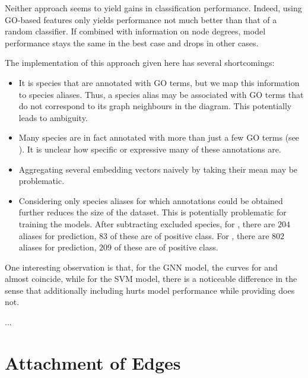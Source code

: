 \documentclass[
	fontsize=10pt, %
	twoside=false, %
	secnumdepth=1, %
  toc=indentunnumbered %
]{kaobook}
\begin{document}
Neither approach seems to yield gains in classification performance. Indeed,
using GO-based features only yields performance not much better than that of a
random classifier. If combined with information on node degrees, model
performance stays the same in the best case and drops in other cases.

The implementation of this approach given here has several shortcomings:
\begin{itemize}
  \item It is species that are annotated with GO terms, but we map this
    information to species aliases. Thus, a species alias may be associated with
    GO terms that do not correspond to its graph neighbours in the diagram. This
    potentially leads to ambiguity. 
\item Many species are in fact annotated with more than just a few GO terms (see
  ). It is unclear how specific or expressive many of
  these annotations are.
\item Aggregating several embedding vectors naively by taking their mean may be problematic.
\item Considering only species aliases for which annotations could be obtained
  further reduces the size of the dataset. This is potentially problematic for
  training the models. After subtracting excluded species, for \ADLast, there
  are $204$ aliases for prediction, $83$ of these are of positive class. For
  \PDMap{}, there are $802$ aliases for prediction, $209$ of these are of positive class.
\end{itemize}

One interesting observation is that, for the GNN model, the curves for
 and  almost coincide, while for the SVM
model, there is a noticeable difference in the sense that additionally including
 hurts model performance while providing 
does not.




...


\section{Attachment of Edges}
\end{document}
